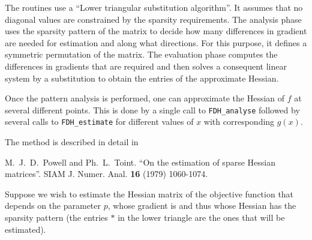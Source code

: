 \documentclass{galahad}
\newcommand{\packagename}{FDH}
\begin{document}

\galmethod
The routines  use a ``Lower triangular  substitution
algorithm''. It assumes  that no  diagonal
values  are constrained  by the sparsity  requirements.
The analysis phase uses the  sparsity pattern  of
the matrix  to decide  how many differences  in
gradient are needed  for estimation  and along what directions.
For this purpose,  it defines  a symmetric permutation  of the
matrix. The evaluation phase  computes  the differences  in
gradients  that are required  and then  solves  a consequent
linear  system by a  substitution to obtain  the entries of  the
approximate  Hessian.

Once the  pattern analysis  is performed,  one can
approximate  the Hessian  of $f$ at several different points.
This is done  by a single call  to {\tt \packagename\_analyse}
followed  by several calls to {\tt \packagename\_estimate}
for different values of $x$ with corresponding $g(x)$.

\vspace*{1mm}

\galreference
\vspace*{1mm}

\noindent
The method is described in detail in
\vspace*{1mm}

\noindent
M.\ J.\ D.\ Powell and  Ph.\ L.\ Toint. ``On the estimation  of
sparse Hessian matrices''. SIAM J. Numer. Anal. {\bf 16} (1979) 1060-1074.


\galexamples
Suppose we wish to estimate the Hessian matrix of the objective function
that depends on the parameter $p$, whose gradient is
and thus whose Hessian has the sparsity pattern
(the entries $\ast$ in the lower triangle are the ones that will be estimated).
\end{document}
